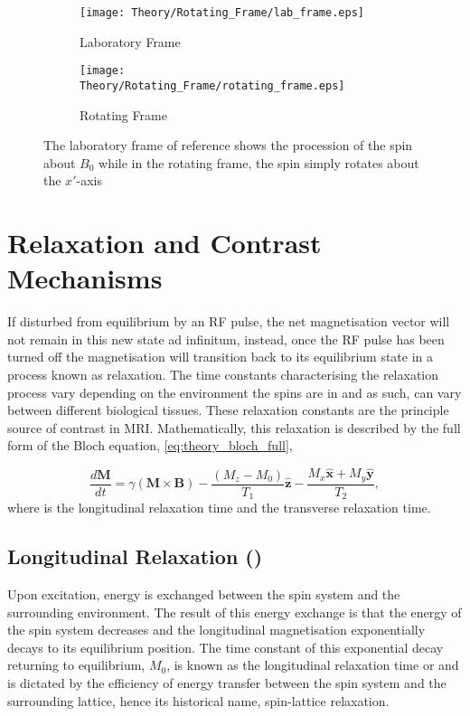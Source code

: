 \begin{figure}[H]
	\centering
	\begin{subfigure}[c]{0.47\textwidth}
		\centering
		\texttt{[image: Theory/Rotating\_Frame/lab\_frame.eps]}
		\caption{Laboratory Frame}
		\label{fig:thoery_lab_frame}
	\end{subfigure}
	\hfill
	\begin{subfigure}[c]{0.47\textwidth}
		\centering
		\texttt{[image: Theory/Rotating\_Frame/rotating\_frame.eps]}
		\caption{Rotating Frame}
		\label{fig:theory_rotating_frame}
	\end{subfigure}
	\caption{The laboratory frame of reference shows the procession of the spin about $B_0$ while in the rotating frame, the spin simply rotates about the $x'$-axis}
	\label{fig:theory_reference_frames}
\end{figure}

\newpage
\section{Relaxation and Contrast Mechanisms}
If disturbed from equilibrium by an \ac{RF} pulse, the net magnetisation vector will not remain in this new state ad infinitum, instead, once the \ac{RF} pulse has been turned off the magnetisation will transition back to its equilibrium state in a process known as relaxation. The time constants characterising the relaxation process vary depending on the environment the spins are in and as such, can vary between different biological tissues. These relaxation constants are the principle source of contrast in \ac{MRI}. Mathematically, this relaxation is described by the full form of the Bloch equation, \eqref{eq:theory_bloch_full},

\begin{equation}
\frac{d\mathbf{M}}{dt} = \gamma \left( \mathbf{M \times B} \right) - \frac{\left( M_z - M_0 \right)}{T_1}\mathbf{\hat{z}} - \frac{M_x \mathbf{\hat{x}} + M_y \mathbf{\hat{y}}}{T_2},
\label{eq:theory_bloch_full}
\end{equation}
where \tone is the longitudinal relaxation time and \ttwo the transverse relaxation time.

\subsection{Longitudinal Relaxation (\tone)}
\label{subsec:theory_t1}
Upon excitation, energy is exchanged between the spin system and the surrounding environment. The result of this energy exchange is that the energy of the spin system decreases and the longitudinal magnetisation exponentially decays to its equilibrium position. The time constant of this exponential decay returning to equilibrium, $M_0$, is known as the longitudinal relaxation time or \tone and is dictated by the efficiency of energy transfer between the spin system and the surrounding lattice, hence its historical name, spin-lattice relaxation.


